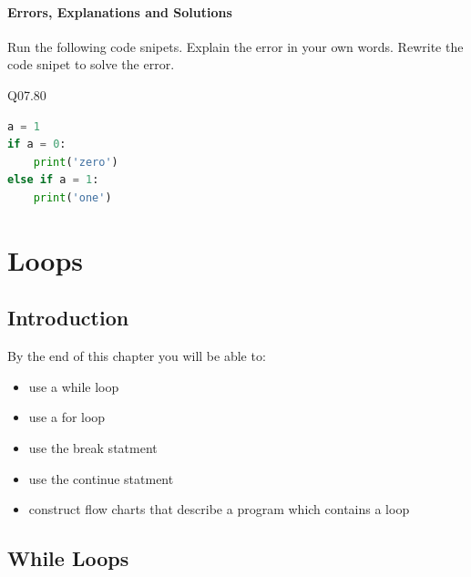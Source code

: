 \documentclass{book}
\begin{document}
    




    
        \subsubsection{Errors, Explanations and
Solutions}\label{errors-explanations-and-solutions}

Run the following code snipets. Explain the error in your own words.
Rewrite the code snipet to solve the error.
    




    
        Q07.80

\begin{lstlisting}[language=Python]
a = 1
if a = 0:
    print('zero')
else if a = 1:
    print('one')
\end{lstlisting}
    




    
        \chapter{Loops}\label{loops}
    




    
        \section{Introduction}\label{introduction}
    




    
        By the end of this chapter you will be able to:

\begin{itemize}
\item
  use a while loop
\item
  use a for loop
\item
  use the break statment
\item
  use the continue statment
\item
  construct flow charts that describe a program which contains a loop
\end{itemize}
        \newpage



    




    
        \section{While Loops}\label{while-loops}
    
\end{document}
